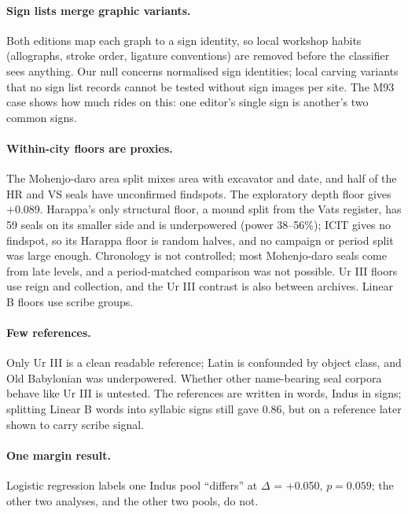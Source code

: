 \documentclass[11pt,a4paper]{article}
\newcommand{\sign}[1]{\textsf{#1}}
\begin{document}
\paragraph{Sign lists merge graphic variants.} Both editions map each graph to a sign identity, so local workshop habits (allographs, stroke order, ligature conventions) are removed before the classifier sees anything. %
Our null concerns normalised sign identities; local carving variants that no sign list records cannot be tested without sign images per site. %
The \sign{M93} case shows how much rides on this: one editor's single sign is another's two common signs.

\paragraph{Within-city floors are proxies.} The Mohenjo-daro area split mixes area with excavator and date, and half of the HR and VS seals have unconfirmed findspots. %
The exploratory depth floor gives +0.089. %
Harappa's only structural floor, a mound split from the Vats register, has 59 seals on its smaller side and is underpowered (power 38--56\%); ICIT gives no findspot, so its Harappa floor is random halves, and no campaign or period split was large enough. %
Chronology is not controlled; most Mohenjo-daro seals come from late levels, and a period-matched comparison was not possible. %
Ur III floors use reign and collection, and the Ur III contrast is also between archives. %
Linear B floors use scribe groups. %

\paragraph{Few references.} Only Ur III is a clean readable reference; Latin is confounded by object class, and Old Babylonian was underpowered. %
Whether other name-bearing seal corpora behave like Ur III is untested.
The references are written in words, Indus in signs; splitting Linear B words into syllabic signs still gave 0.86, but on a reference later shown to carry scribe signal. %

\paragraph{One margin result.} Logistic regression labels one Indus pool ``differs'' at $\Delta$ = +0.050, $p = 0.059$; the other two analyses, and the other two pools, do not. %
\end{document}
